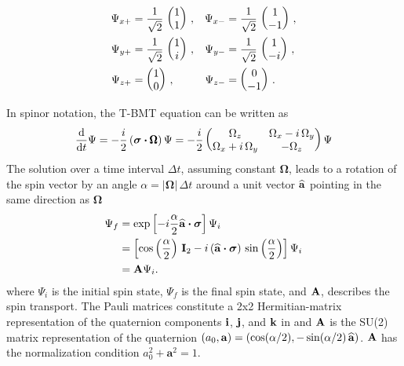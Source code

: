 \begin{align}
   \Psi_{x+} &= \frac{1}{\sqrt{2}} \, \begin{pmatrix} 1 \\ 1 \end{pmatrix} \, , 
  &\Psi_{x-} &= \frac{1}{\sqrt{2}} \, \begin{pmatrix} 1 \\ -1 \end{pmatrix} \, , \nonumber \\
   \Psi_{y+} &= \frac{1}{\sqrt{2}} \, \begin{pmatrix} 1 \\ i \end{pmatrix} \, , 
  &\Psi_{y-} &= \frac{1}{\sqrt{2}} \, \begin{pmatrix} 1 \\ -i \end{pmatrix} \, , \\
   \Psi_{z+} &=                       \begin{pmatrix} 1 \\ 0 \end{pmatrix} \, , 
  &\Psi_{z-} &=                       \begin{pmatrix} 0 \\ -1 \end{pmatrix} \, . \nonumber
\end{align}

In spinor notation, the T-BMT equation can be written as
  \begin{equation}   
    \frac{\mathrm{d}}{\mathrm{d} t} \Psi = - \frac{i}{2} \left( \boldsymbol{\sigma} \mathbin{\boldsymbol{\cdot}}   
    {\pmb\Omega} \right) \Psi = -\frac{i}{2} \begin{pmatrix}
    \Omega_z & \Omega_x - i \, \Omega_y \\
    \Omega_x + i \, \Omega_y & -\Omega_z \end{pmatrix}
    \Psi
  \end{equation}
The solution over a time interval $\Delta t$, assuming constant $\pmb\Omega$, leads to a rotation of
the spin vector by an angle $\alpha = |\pmb\Omega| \, \Delta t$ around a unit vector ${\widehat{\bf a}}$
pointing in the same direction as $\pmb\Omega$
  \begin{align}   
    \Psi_f &= \exp \left[ -i \frac{\alpha}{2} {\widehat{\bf a}} \mathbin{\boldsymbol{\cdot}} \boldsymbol{\sigma} \right] \Psi_i \nonumber \\
         &= \left[ \cos \left( \frac{\alpha}{2} \right) \, {\bf I}_{2} - 
            i \, ({\widehat{\bf a}} \mathbin{\boldsymbol{\cdot}} \boldsymbol{\sigma}) \, \sin \left( \frac{\alpha}{2} \right) \right] \Psi_i \\
         &= {\bf A} \Psi_i. \nonumber
  \end{align}   
where $\Psi_i$ is the initial spin state, $\Psi_f$ is the final spin state, and ${\bf A}$, describes
the spin transport. The Pauli matrices constitute a 2x2 Hermitian-matrix representation of the
quaternion components ${\bf i}$, ${\bf j}$, and ${\bf k}$ in  and ${\bf A}$ is the SU(2) matrix
representation of the quaternion $(a_0, {\bf a}) = (\cos(\alpha/2), -\sin(\alpha/2) \, {\widehat{\bf a}})$. ${\bf A}$ has the normalization condition $a_{0}^{2} + \boldsymbol{a}^{2} = 1$.


